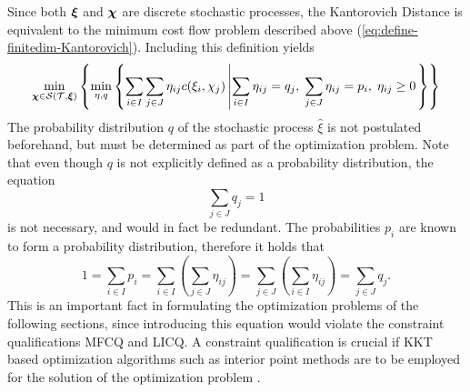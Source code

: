 Since both $\boldsymbol\xi$ and $\boldsymbol\chi$ are discrete stochastic processes, the Kantorovich Distance is equivalent to the minimum cost flow problem described above (\ref{eq:define-finitedim-Kantorovich}).
Including this definition yields
\begin{equation}
  \label{eq:symbolic-optimization-with-minflow}
  \min_{\boldsymbol\chi\in\mathcal{S}(\mathcal{T},\boldsymbol\xi)}\left\{\min_{\eta,q}\left\{\sum_{i\in I}\sum_{j\in J}\eta_{ij}c(\xi_i,\chi_j)\left|\sum_{i\in I}\eta_{ij}=q_j,\;\sum_{j\in J}\eta_{ij}=p_i,\;\eta_{ij}\geq 0\right.\right\}\right\}
\end{equation}
The probability distribution $q$ of the stochastic process $\hat{\xi}$ is not postulated beforehand, but must be determined as part of the optimization problem.
Note that even though $q$ is not explicitly defined as a probability distribution, the equation
\begin{equation}
  \label{eq:q-schliessbedingung}
  \sum_{j\in J} q_j = 1
\end{equation}
is not necessary, and would in fact be redundant.
The probabilities $p_i$ are known to form a probability distribution, therefore it holds that
\begin{equation}
  \label{eq:proof-sum-q-redundant}
  1 = \sum_{i\in I}p_i = \sum_{i\in I}\left(\sum_{j\in J}\eta_{ij}\right)=\sum_{j\in J}\left(\sum_{i\in I}\eta_{ij}\right)=\sum_{j\in J} q_j.
\end{equation}
This is an important fact in formulating the optimization problems of the following sections, since introducing this equation would violate the constraint qualifications MFCQ and LICQ.
A constraint qualification is crucial if KKT based optimization algorithms such as interior point methods are to be employed for the solution of the optimization problem \cite{Jongen2004}.

